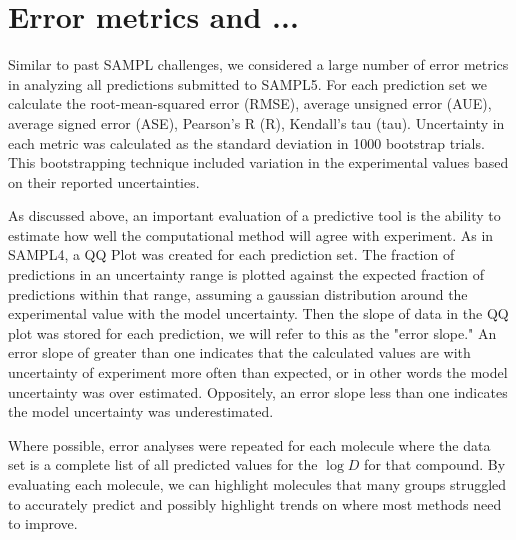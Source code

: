 \section{Error metrics and ...}
\label{analysisMethods}
Similar to past SAMPL challenges, we considered a large number of error metrics in analyzing all predictions submitted to SAMPL5. 
For each prediction set we calculate the root-mean-squared error (RMSE), average unsigned error (AUE), average signed error (ASE), Pearson's R (R), Kendall's tau (tau). %
Uncertainty in each metric was calculated as the standard deviation in 1000 bootstrap trials. 
This bootstrapping technique included variation in the experimental values based on their reported uncertainties. 

As discussed above, an important evaluation of a predictive tool is the ability to estimate how well the computational method will agree with experiment. %
As in SAMPL4, a QQ Plot %
was created for each prediction set. 
The fraction of predictions in an uncertainty range is plotted against the expected fraction of predictions within that range, assuming a gaussian distribution around the experimental value with the model uncertainty. %
Then the slope of data in the QQ plot was stored for each prediction, we will refer to this as the "error slope." 
An error slope of greater than one indicates that the calculated values are with uncertainty of experiment more often than expected, or in other words the model uncertainty was over estimated. 
Oppositely, an error slope less than one indicates the model uncertainty was underestimated. %

Where possible, error analyses were repeated for each molecule where the data set is a complete list of all predicted values for the $\log D$ for that compound. 
By evaluating each molecule, we can highlight molecules that many groups struggled to accurately predict and possibly highlight trends on where most methods need to improve. 

